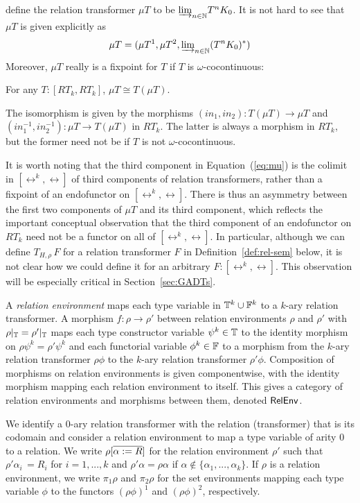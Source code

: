 \documentclass{lmcs}
\theoremstyle{plain}\newtheorem{satz}[thm]{Satz}
\begin{document}
define the relation transformer $\mu T$ to be ${{\underrightarrow{\lim}}_{n \in \mathbb{N}}{T^n
  K_0}}$. It is not hard to see that $\mu T$ is given explicitly as
\begin{equation}\label{eq:mu}
\mu T = (\mu T^1,\mu T^2, {{\underrightarrow{\lim}}_{n \in \mathbb{N}}{(T^nK_0)^*}})
\end{equation}
Moreover, $\mu T$ really is a fixpoint for $T$ if $T$ is
$\omega$-cocontinuous:
\begin{lem}\label{lem:fp}
For any $T : [RT_k,RT_k]$, $\mu T \cong T(\mu T)$.
\end{lem}
\noindent
The isomorphism is given by the morphisms $(\mathit{in}_1,
\mathit{in}_2) : T(\mu T) \to \mu T$ and $(in_1^{-1}, in_2^{-1}) : \mu
T \to T(\mu T)$ in $RT_k$. The latter is always a morphism in $RT_k$,
but the former need not be if $T$ is not $\omega$-cocontinuous.

It is worth noting that the third component in Equation~(\ref{eq:mu})
is the colimit in $[\rel^k,\rel]$ of third components of relation
transformers, rather than a fixpoint of an endofunctor on
$[\rel^k,\rel]$. There is thus an asymmetry between the first two
components of $\mu T$ and its third component, which reflects the
important conceptual observation that the third component of an
endofunctor on $RT_k$ need not be a functor on all of
$[\rel^k,\rel]$. In particular, although we can define $T_{H,\rho}\,
F$ for a relation transformer $F$ in Definition~\ref{def:rel-sem}
below, it is not clear how we could define it for an arbitrary $F :
[\rel^k,\rel]$. This observation will be especially critical in
Section~\ref{sec:GADTs}.

\begin{defi}\label{def:reln-env}
A {\em relation environment} maps each type variable in $\mathbb{T}^k \cup
\mathbb{F}^k$ to a $k$-ary relation transformer.  A morphism $f : \rho \to
\rho'$ between relation environments $\rho$ and $\rho'$ with
$\rho|_{\mathbb{T}} = \rho'|_{\mathbb{T}}$ maps each type constructor variable
$\psi^k \in \mathbb{T}$ to the identity morphism on $\rho \psi^k = \rho'
\psi^k$ and each functorial variable $\phi^k \in \mathbb{F}$ to a morphism
from the $k$-ary relation transformer $\rho \phi$ to the $k$-ary
relation transformer $\rho' \phi$. Composition of morphisms on
relation environments is given componentwise, with the identity
morphism mapping each relation environment to itself. This gives a
category of relation environments and morphisms between them, denoted
$\mathsf{RelEnv}$.
\end{defi}
We identify a $0$-ary relation transformer with the relation
(transformer) that is its codomain and consider a relation environment
to map a type variable of arity $0$ to a relation.  We write
$\rho[\overline{\alpha := R}]$ for the relation environment $\rho'$ such
that $\rho' \alpha_i \, = R_i$ for $i = 1,...,k$ and $\rho' \alpha =
\rho\alpha$ if $\alpha \not \in \{\alpha_1,...,\alpha_k\}$.  If $\rho$
is a relation environment, we write $\pi_1 \rho$ and $\pi_2 \rho$ for
the set environments mapping each type variable $\phi$ to the functors
$(\rho\phi)^1$ and $(\rho\phi)^2$, respectively.
\end{document}
